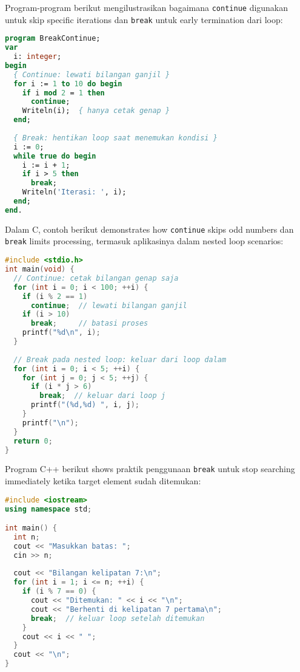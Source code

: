 \documentclass[../main.tex]{subfiles}
\begin{document}
Program-program berikut mengilustrasikan bagaimana \texttt{continue} digunakan untuk skip specific iterations dan \texttt{break} untuk early termination dari loop:

\begin{lstlisting}[language=Pascal, caption={break dan continue di Pascal}]
program BreakContinue;
var
  i: integer;
begin
  { Continue: lewati bilangan ganjil }
  for i := 1 to 10 do begin
    if i mod 2 = 1 then
      continue;
    Writeln(i);  { hanya cetak genap }
  end;
  
  { Break: hentikan loop saat menemukan kondisi }
  i := 0;
  while true do begin
    i := i + 1;
    if i > 5 then
      break;
    Writeln('Iterasi: ', i);
  end;
end.
\end{lstlisting}

Dalam C, contoh berikut demonstrates how \texttt{continue} skips odd numbers dan \texttt{break} limits processing, termasuk aplikasinya dalam nested loop scenarios:

\begin{lstlisting}[language=C, caption={break dan continue di C}]
#include <stdio.h>
int main(void) {
  // Continue: cetak bilangan genap saja
  for (int i = 0; i < 100; ++i) {
    if (i % 2 == 1)
      continue;  // lewati bilangan ganjil
    if (i > 10)
      break;     // batasi proses
    printf("%d\n", i);
  }
  
  // Break pada nested loop: keluar dari loop dalam
  for (int i = 0; i < 5; ++i) {
    for (int j = 0; j < 5; ++j) {
      if (i * j > 6)
        break;  // keluar dari loop j
      printf("(%d,%d) ", i, j);
    }
    printf("\n");
  }
  return 0;
}
\end{lstlisting}

Program C++ berikut shows praktik penggunaan \texttt{break} untuk stop searching immediately ketika target element sudah ditemukan:

\begin{lstlisting}[language=C++, caption={break saat menemukan kondisi (C++)}]
#include <iostream>
using namespace std;

int main() {
  int n;
  cout << "Masukkan batas: ";
  cin >> n;
  
  cout << "Bilangan kelipatan 7:\n";
  for (int i = 1; i <= n; ++i) {
    if (i % 7 == 0) {
      cout << "Ditemukan: " << i << "\n";
      cout << "Berhenti di kelipatan 7 pertama\n";
      break;  // keluar loop setelah ditemukan
    }
    cout << i << " ";
  }
  cout << "\n";
}
\end{lstlisting}
\end{document}
